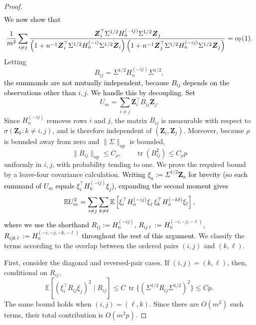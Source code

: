 \documentclass{article}
\theoremstyle{plain}
\theoremstyle{remark}
\def \bZ{\mathbf{Z}}
\def \E{\mathbb{E}}
\def \P{\mathbb{P}}
\def \bZ {{\boldsymbol{Z}}}
\begin{document}
\begin{proof}
\begin{align*}
\end{align*}
\textcolor{black}{We now show that}
\[
\frac{1}{m^2}
\sum_{i\ne j}
\frac{
\bZ_i^\top \Sigma^{1/2}H_n^{(-ij)}\Sigma^{1/2}\textcolor{black}{\bZ_j}
}{
\left(1+n^{-1}\bZ_i^\top \Sigma^{1/2}H_n^{(-i)}\Sigma^{1/2}\bZ_i\right)
\left(1+n^{-1}\bZ_j^\top \Sigma^{1/2}H_n^{(-ij)}\Sigma^{1/2}\bZ_j\right)
}
=o_{\P}(1).
\]
Letting
\[
B_{ij}=\Sigma^{1/2}H_n^{(-ij)}\Sigma^{1/2},
\]
\textcolor{black}{the summands are not mutually independent, because \(B_{ij}\) depends on the observations other than \(i,j\). We handle this by decoupling. Set}
\[
U_m=\sum_{i\ne j}\bZ_i^\top B_{ij}\bZ_j.
\]
Since \(H_n^{(-ij)}\) removes rows \(i\) and \(j\), the matrix \(B_{ij}\) is
measurable with respect to \(\sigma(\bZ_k:k\ne i,j)\), and is therefore
independent of \((\bZ_i,\bZ_j)\). Moreover, because \(\rho\) is bounded away from
zero and \(\|\Sigma\|_{\mathrm{op}}\) is bounded,
\[
\|B_{ij}\|_{\mathrm{op}}\le C_\rho,\qquad
\operatorname{tr}(B_{ij}^2)\le C_\rho p
\]
uniformly in \(i,j\), with probability tending to one. We prove the required bound by a leave-four covariance calculation. \textcolor{black}{Writing $\xi_a:=\Sigma^{1/2}\bZ_a$ for brevity (so each summand of $U_m$ equals $\xi_i^\top H_n^{(-ij)}\xi_j$), expanding the second moment gives}
\[
\E U_m^2
=
\sum_{i\ne j}\sum_{k\ne \ell}
\E\left[
\textcolor{black}{\xi_i^\top H_n^{(-ij)}\xi_j\,
\xi_k^\top H_n^{(-k\ell)}\xi_\ell}
\right],
\]
\textcolor{black}{where we use the shorthand $R_{ij}:=H_n^{(-ij)}$, $R_{ij\ell}:=H_n^{(-i,-j,-\ell)}$, $R_{ijk\ell}:=H_n^{(-i,-j,-k,-\ell)}$ throughout the rest of this argument.}
We classify the terms according to the overlap between the ordered pairs \((i,j)\) and
\((k,\ell)\).

First, consider the diagonal and reversed-pair cases.  If \((i,j)=(k,\ell)\), then, conditional on
\(R_{ij}\),
\[
\E\left[(\xi_i^\top R_{ij}\xi_j)^2\mid R_{ij}\right]
\le C\,\operatorname{tr}\{(\Sigma^{1/2}R_{ij}\Sigma^{1/2})^2\}
\le Cp.
\]
The same bound holds when \((i,j)=(\ell,k)\).  Since there are \(O(m^2)\) such terms, their total
contribution is \(O(m^2p)\).


\end{proof}
\end{document}
